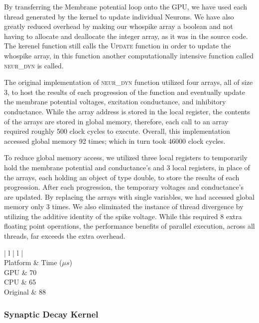 \documentclass[a4paper]{article}
\begin{document}
By transferring the Membrane potential loop onto the GPU, we have used each thread generated by the kernel to update individual Neurons. We have also greatly reduced overhead by making our whospike array a boolean and not having to allocate and deallocate the integer array, as it was in the source code. The kerenel function still calls the \textsc{Update} function in order to update the whospike array, in this function another computationally intensive function called \textsc{neur\_dyn} is called.

The original implementation of \textsc{neur\_dyn} function utilized four arrays, all of size 3, to host the results of each progression of the function and eventually update the membrane potential voltages, excitation conductance, and inhibitory conductance. While the array address is stored in the local register, the contents of the arrays are stored in global memory, therefore, each call to an array required roughly 500 clock cycles to execute. Overall, this implementation accessed global memory 92 times; which in turn took 46000 clock cycles. 

To reduce global memory access, we utilized three local registers to temporarily hold the membrane potential and conductance's and 3 local registers, in place of the arrays, each holding an object of type double, to store the results of each progression. After each progression, the temporary voltages and conductance's are updated. By replacing the arrays with single variables, we had accessed global memory only 3 times. We also eliminated the instance of thread divergence by utilizing the additive identity of the spike voltage. While this required 8 extra floating point operations, the performance benefits of parallel execution, across all threads, far exceeds the extra overhead. 
\begin{center}
\begin{tabular}{ | l | l | }
	\hline
	 \\
	\hline
	Platform & Time ($\mu s$) \\ \hline
	GPU & 70 \\ \hline
	CPU & 65 \\ \hline
	Original & 88  \\
	\hline
	\end{tabular}
\end{center}


\subsubsection{Synaptic Decay Kernel}
\end{document}
